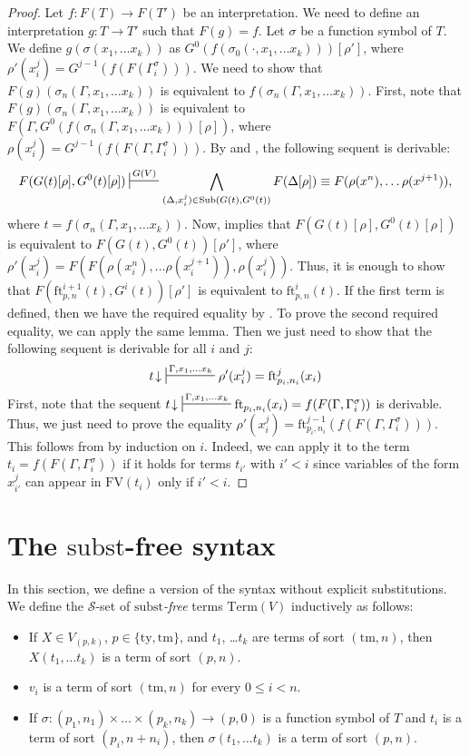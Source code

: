 \documentclass[reqno]{amsart}
\theoremstyle{definition}
\theoremstyle{remark}
\newcommand{\fs}[1]{\mathrm{#1}}
\newcommand{\Term}{\fs{Term}}
\newcommand{\FV}{\fs{FV}}
\newcommand{\subst}{\fs{subst}}
\newcommand{\ft}{\fs{ft}}
\newcommand{\ty}{\fs{ty}}
\newcommand{\tm}{\fs{tm}}
\newcommand{\sub}{\fs{Sub}}
\numberwithin{figure}{section}
\begin{document}
\begin{proof}
Let $f : F(T) \to F(T')$ be an interpretation.
We need to define an interpretation $g : T \to T'$ such that $F(g) = f$.
Let $\sigma$ be a function symbol of $T$.
We define $g(\sigma(x_1, \ldots x_k))$ as $G^0(f(\sigma_0(\cdot, x_1, \ldots x_k)))[\rho']$, where $\rho'(x_i^j) = G^{j-1}(f(F(\Gamma^\sigma_i)))$.
We need to show that $F(g)(\sigma_n(\Gamma, x_1, \ldots x_k))$ is equivalent to $f(\sigma_n(\Gamma, x_1, \ldots x_k))$.
First, note that $F(g)(\sigma_n(\Gamma, x_1, \ldots x_k))$ is equivalent to $F(\Gamma, G^0(f(\sigma_n(\Gamma, x_1, \ldots x_k)))[\rho])$, where $\rho(x_i^j) = G^{j-1}(f(F(\Gamma,\Gamma^\sigma_i)))$.
By  and , the following sequent is derivable:
\[ F(G(t)[\rho], G^0(t)[\rho]) \sststile{}{G(V)} \bigwedge_{(\Delta,x_i^j) \in \sub(G(t), G^0(t))} F(\Delta[\rho]) \equiv F(\rho(x^n), \ldots \rho(x^{j+1})), \]
where $t = f(\sigma_n(\Gamma, x_1, \ldots x_k))$.
Now,  implies that $F(G(t)[\rho], G^0(t)[\rho])$ is equivalent to $F(G(t), G^0(t))[\rho']$, where $\rho'(x_i^j) = F(F(\rho(x_i^n), \ldots \rho(x_i^{j+1})), \rho(x_i^j))$.
Thus, it is enough to show that $F(\ft^{i+1}_{p,n}(t), G^i(t))[\rho']$ is equivalent to $\ft^i_{p,n}(t)$.
If the first term is defined, then we have the required equality by .
To prove the second required equality, we can apply the same lemma.
Then we just need to show that the following sequent is derivable for all $i$ and $j$:
\[ t\!\downarrow\ \sststile{}{\Gamma, x_1, \ldots x_k} \rho'(x_i^j) = \ft^j_{p_i,n_i}(x_i) \]
First, note that the sequent $t\!\downarrow\ \sststile{}{\Gamma, x_1, \ldots x_k} \ft_{p_i,n_i}(x_i) = f(F(\Gamma, \Gamma^\sigma_i))$ is derivable.
Thus, we just need to prove the equality $\rho'(x_i^j) = \ft^{j-1}_{p_i,n_i}(f(F(\Gamma, \Gamma^\sigma_i)))$.
This follows from  by induction on $i$.
Indeed, we can apply it to the term $t_i = f(F(\Gamma, \Gamma^\sigma_i))$ if it holds for terms $t_{i'}$ with $i' < i$ since variables of the form $x_{i'}^j$ can appear in $\FV(t_i)$ only if $i' < i$.
\end{proof}

\section{The $\subst$-free syntax}

In this section, we define a version of the syntax without explicit substitutions.
We define the $\mathcal{S}$-set of \emph{$\subst$-free} terms $\Term(V)$ inductively as follows:
\begin{itemize}
\item If $X \in V_{(p,k)}$, $p \in \{ \ty, \tm \}$, and $t_1$, \ldots $t_k$ are terms of sort $(\tm,n)$, then $X(t_1, \ldots t_k)$ is a term of sort $(p,n)$.
\item $v_i$ is a term of sort $(\tm,n)$ for every $0 \leq i < n$.
\item If $\sigma : (p_1,n_1) \times \ldots \times (p_k,n_k) \to (p,0)$ is a function symbol of $T$ and $t_i$ is a term of sort $(p_i,n+n_i)$, then $\sigma(t_1, \ldots t_k)$ is a term of sort $(p,n)$.
\end{itemize}
\end{document}
